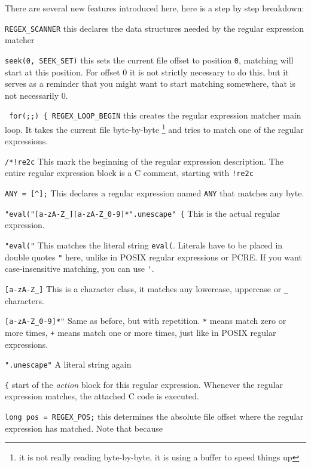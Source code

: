 There are several new features introduced here, here is a step by step breakdown:
\begin{description}
 \item \verb+REGEX_SCANNER+ this declares the data structures needed by the regular expression matcher
 \item \verb+seek(0, SEEK_SET)+ this sets the current file offset to position \verb+0+, matching will start at this position.
For offset 0 it is not strictly necessary to do this, but it serves as a reminder that you might want to start matching somewhere, that is not necessarily 0.
 \item \verb+ for(;;) { REGEX_LOOP_BEGIN+ this creates the regular expression matcher main loop. It takes the current file byte-by-byte \footnote{it is not really
reading byte-by-byte, it is using a buffer to speed things up} and tries to match one of the regular expressions.
 \item \verb+/*!re2c+ This mark the beginning of the regular expression description. The entire regular expression block is a C comment, starting with \verb+!re2c+
 \item \verb+ANY = [^];+ This declares a regular expression named \verb+ANY+ that matches any byte.
 \item \verb+"eval("[a-zA-Z_][a-zA-Z_0-9]*".unescape" {+ This is the actual regular expression.
\begin{description}
 \item \verb+"eval("+ This matches the literal string \verb+eval(+. 
Literals have to be placed in double quotes \verb+"+ here, unlike in POSIX regular expressions or PCRE.
If you want case-insensitive matching, you can use \verb+'+.
 \item \verb+[a-zA-Z_]+ This is a character class, it matches any lowercase, uppercase or \verb+_+ characters.
 \item \verb+[a-zA-Z_0-9]*"+ Same as before, but with repetition. \verb+*+ means match zero or more times, \verb|+| means match one or more times, just like in POSIX
regular expressions.
 \item \verb+".unescape"+ A literal string again
 \item \verb+{+ start of the \emph{action} block for this regular expression. Whenever the regular expression matches, the attached C code is executed.
\end{description}
 \item \verb+long pos = REGEX_POS;+ this determines the absolute file offset where the regular expression has matched. Note that because

\end{description}
